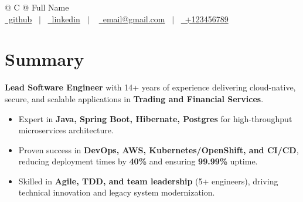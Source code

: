 \documentclass[a4paper,12pt]{article}
\begin{document}
\pagestyle{empty} 



\begin{tabularx}{\linewidth}{@{} C @{}}
\Huge{Full Name} \\[7.5pt]
\href{https://github.com}{\raisebox{-0.05\height}\faGithub\ github} \ $|$ \ 
\href{https://linkedin.com}{\raisebox{-0.05\height}\faLinkedin\ linkedin} \ $|$ \ 
\href{mailto:email@gmail.com}{\raisebox{-0.05\height}\faEnvelope \ email@gmail.com} \ $|$ \ 
\href{tel:+123456789}{\raisebox{-0.05\height}\faMobile \ +123456789} \\
\end{tabularx}


\section{Summary}
\textbf{Lead Software Engineer} with 14+ years of experience delivering cloud-native, secure, and scalable applications in \textbf{Trading and Financial Services}. \begin{itemize}[nosep, leftmargin=1em, itemsep=1pt,label=--]\item Expert in \textbf{Java, Spring Boot, Hibernate, Postgres} for high-throughput microservices architecture. \item Proven success in \textbf{DevOps, AWS, Kubernetes/OpenShift, and CI/CD}, reducing deployment times by \textbf{40\%} and ensuring \textbf{99.99\%} uptime. \item Skilled in \textbf{Agile, TDD, and team leadership} (5+ engineers), driving technical innovation and legacy system modernization. \end{itemize}
\end{document}
